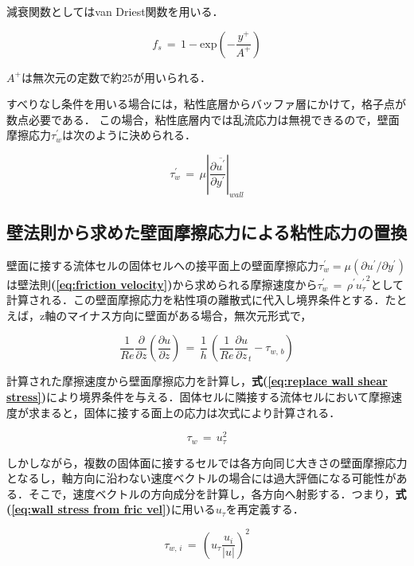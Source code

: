 \noindent 減衰関数としてはvan Driest関数を用いる．

\begin{equation}
f_s \,=\, 1 - \mathrm{exp} \left( -\frac{y^+}{A^+} \right)
\label{eq:van-driest}
\end{equation}

\noindent $A^+$は無次元の定数で約25が用いられる．

すべりなし条件を用いる場合には，粘性底層からバッファ層にかけて，格子点が数点必要である．
この場合，粘性底層内では乱流応力は無視できるので，壁面摩擦応力$\tau_w^{\prime}$は次のように決められる．

\begin{equation}
\tau_w^{\prime} \,=\, \mu \left| \frac{\partial \overline{u^{\prime}}}{\partial y^{\prime}} \right|_{wall}
\label{eq:viscous layer stress}
\end{equation}

%
\subsection{壁法則から求めた壁面摩擦応力による粘性応力の置換}
壁面に接する流体セルの固体セルへの接平面上の壁面摩擦応力$\tau_w^{\prime}=\mu(\partial u^{\prime}/\partial y^{\prime})$は壁法則\textbf{(\ref{eq:friction velocity})}から求められる摩擦速度から$\tau_w^{\prime}\,=\, \rho^{\prime} {u_{\tau}^{\prime}}^2$として計算される．この壁面摩擦応力を粘性項の離散式に代入し境界条件とする．たとえば，z軸のマイナス方向に壁面がある場合，無次元形式で，

\begin{equation}
\frac{1}{Re} \frac{\partial}{\partial z} \left( \frac{\partial u}{\partial z} \right)
\,=\,
\frac{1}{h} \, \left( {\frac{1}{Re} \frac{\partial u}{\partial z}_t - \tau_{w,\,b} } \right)
\label{eq:replace wall shear stress}
\end{equation}


計算された摩擦速度から壁面摩擦応力を計算し，\textbf{式(\ref{eq:replace wall shear stress})}により境界条件を与える．固体セルに隣接する流体セルにおいて摩擦速度が求まると，固体に接する面上の応力は次式により計算される．

\begin{equation} 
\tau_w\,=\, u_{\tau}^2
\label{eq:wall stress from fric vel}
\end{equation}

\noindent しかしながら，複数の固体面に接するセルでは各方向同じ大きさの壁面摩擦応力となるし，軸方向に沿わない速度ベクトルの場合には過大評価になる可能性がある．そこで，速度ベクトルの方向成分を計算し，各方向へ射影する．つまり，\textbf{式(\ref{eq:wall stress from fric vel})}に用いる$u_{\tau}$を再定義する．

\begin{equation} 
\tau_{w,\,i} \,=\, {\left( u_{\tau} \frac{u_i}{|u|} \right)}^2
\label{eq:redefine of friction velocity}
\end{equation}




